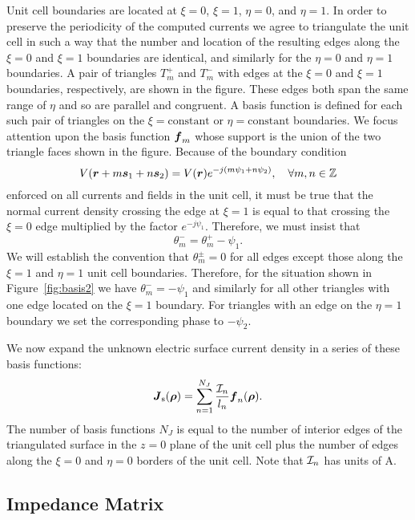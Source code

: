 %
Unit cell boundaries are located at $\xi = 0$, $\xi = 1$, $\eta = 0$,
and $\eta = 1$.  In order to preserve the periodicity of the computed
currents we agree to triangulate the unit cell in such a way
that the number and location of the resulting edges along the $\xi = 0$ and $\xi
= 1$ boundaries are identical, and similarly for the $\eta = 0$ and $\eta
= 1$ boundaries.  A pair of triangles $T_m^+$ and $T_m^-$ with 
edges at the $\xi=0$ and
$\xi=1$ boundaries, respectively, are shown in the figure.  
These edges both span the same range of $\eta$ and so are parallel and
congruent. A basis function is defined for each such pair of triangles
on the $\xi = \text{constant}$ or $\eta = \text{constant}$ boundaries.
We focus attention upon the basis function $\boldsymbol{f}_m$ whose support is
the union of the two triangle faces shown in the figure.  
Because of the boundary condition
\begin{equation}
  V(\boldsymbol{r} + m\boldsymbol{s}_1 + n\boldsymbol{s}_2) = V(\boldsymbol{r}) e^{-j(m\psi_1 + n \psi_2)}, \quad
  \forall m,n \in \mathbb{Z}
\end{equation}
enforced on all currents and fields in the unit cell,
it must be true that the normal current density crossing the edge at $\xi=1$
is equal to that crossing the $\xi=0$ edge multiplied by the factor
$e^{-j\psi_1}$.  Therefore, we must insist that
\begin{equation}
  \theta_m^- = \theta_m^+ - \psi_1.
\end{equation}
We will establish the convention that $\theta_m^\pm = 0$ for all edges
except those along the $\xi=1$ and $\eta=1$ unit cell boundaries.  Therefore, for
the situation shown in Figure~\ref{fig:basis2} we have $\theta_m^- =
-\psi_1$ and similarly for all other triangles with one edge located
on the $\xi = 1$ boundary.  For triangles with an edge on the $\eta=1$
boundary we set the corresponding phase to $-\psi_2$.  

We now expand the unknown electric surface current density in a series of these basis
functions:
\begin{equation}
  \label{eq:Jexpand}
  \boldsymbol{J}_{\text{s}}(\boldsymbol{\rho}) =  \sum_{n=1}^{N_J} \frac{\mathcal{I}_n}{l_n} \boldsymbol{f}_n(\boldsymbol{\rho}).
\end{equation}
The number of basis functions
$N_J$ is equal to the number of interior edges of the triangulated surface in the
$z=0$ plane of the unit cell plus the number of edges along the $\xi=0$ and $\eta=0$
borders of the unit cell.  Note that $\mathcal{I}_n$ has units of \si{A}.


\subsection{Impedance Matrix}
